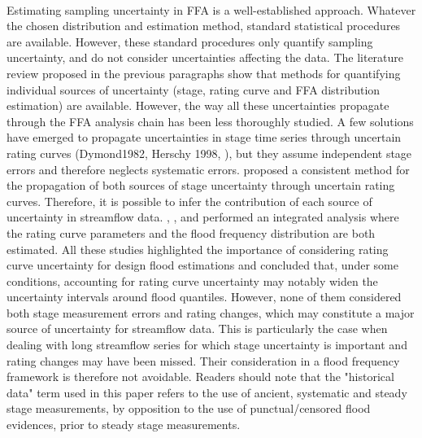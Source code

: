 \documentclass[11pt]{article}
\begin{document}
    \paragraph{}
    Estimating sampling uncertainty in FFA is a well-established approach. Whatever the chosen distribution and estimation method, standard statistical procedures are available. However, these standard procedures only quantify sampling uncertainty, and do not consider uncertainties affecting the data. The literature review proposed in the previous paragraphs show that methods for quantifying individual sources of uncertainty (stage, rating curve and FFA distribution estimation) are available. However, the way all these uncertainties propagate through the FFA analysis chain has been less thoroughly studied. A few solutions have emerged to propagate uncertainties in stage time series through uncertain rating curves (Dymond1982, Herschy 1998, \citet{petersen-overleir_uncertainty_2005}), but they assume independent stage errors and therefore neglects systematic errors. \citet{horner_impact_2018} proposed a consistent method for the propagation of both sources of stage uncertainty through uncertain rating curves. Therefore, it is possible to infer the contribution of each source of uncertainty in streamflow data. \citet{petersen-overleir_accounting_2009}, \citet{steinbakk_propagation_2016}, and \citet{vieira_assessing_2022} performed an integrated analysis where the rating curve parameters and the flood frequency distribution are both estimated. All these studies highlighted the importance of considering rating curve uncertainty for design flood estimations and concluded that, under some conditions, accounting for rating curve uncertainty may notably widen the uncertainty intervals around flood quantiles. However, none of them considered both stage measurement errors and rating changes, which may constitute a major source of uncertainty for streamflow data. This is particularly the case when dealing with long streamflow series for which stage uncertainty is important and rating changes may have been missed. Their consideration in a flood frequency framework is therefore not avoidable. 
    Readers should note that the "historical data" term used in this paper refers to the use of ancient, systematic and steady stage measurements, by opposition to the use of punctual/censored flood evidences, prior to steady stage measurements. 
    
\end{document}
